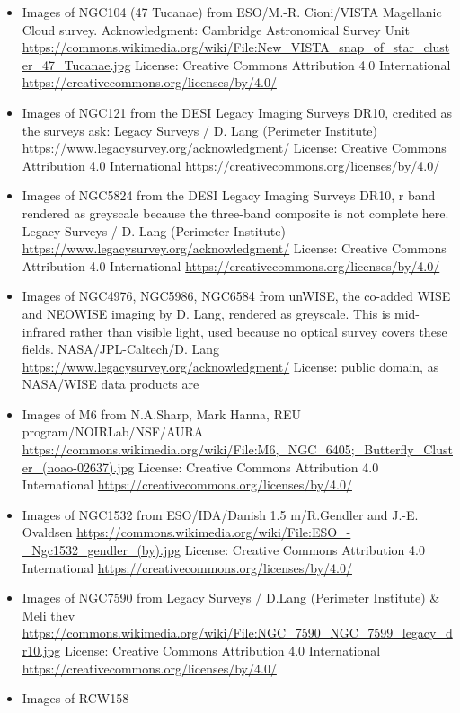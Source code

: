 \begin{itemize}
	 License: Creative Commons Attribution 4.0 International \url{https://creativecommons.org/licenses/by/4.0/}
\item Images of NGC104 (47 Tucanae)
	 from ESO/M.-R. Cioni/VISTA Magellanic Cloud survey. Acknowledgment: Cambridge Astronomical Survey Unit
	 \url{https://commons.wikimedia.org/wiki/File:New_VISTA_snap_of_star_cluster_47_Tucanae.jpg}
	 License: Creative Commons Attribution 4.0 International \url{https://creativecommons.org/licenses/by/4.0/}
\item Images of NGC121
	 from the DESI Legacy Imaging Surveys DR10, credited as the surveys ask: Legacy Surveys / D. Lang (Perimeter Institute)
	 \url{https://www.legacysurvey.org/acknowledgment/}
	 License: Creative Commons Attribution 4.0 International \url{https://creativecommons.org/licenses/by/4.0/}
\item Images of NGC5824
	 from the DESI Legacy Imaging Surveys DR10, r band rendered as greyscale because the three-band composite is not complete here. Legacy Surveys / D. Lang (Perimeter Institute)
	 \url{https://www.legacysurvey.org/acknowledgment/}
	 License: Creative Commons Attribution 4.0 International \url{https://creativecommons.org/licenses/by/4.0/}
\item Images of NGC4976, NGC5986, NGC6584
	 from unWISE, the co-added WISE and NEOWISE imaging by D. Lang, rendered as greyscale. This is mid-infrared rather than visible light, used because no optical survey covers these fields. NASA/JPL-Caltech/D. Lang
	 \url{https://www.legacysurvey.org/acknowledgment/}
	 License: public domain, as NASA/WISE data products are
\item Images of M6
	 from N.A.Sharp, Mark Hanna, REU program/NOIRLab/NSF/AURA
	 \url{https://commons.wikimedia.org/wiki/File:M6,_NGC_6405;_Butterfly_Cluster_(noao-02637).jpg}
	 License: Creative Commons Attribution 4.0 International \url{https://creativecommons.org/licenses/by/4.0/}
\item Images of NGC1532
	 from ESO/IDA/Danish 1.5 m/R.Gendler and J.-E. Ovaldsen
	 \url{https://commons.wikimedia.org/wiki/File:ESO_-_Ngc1532_gendler_(by).jpg}
	 License: Creative Commons Attribution 4.0 International \url{https://creativecommons.org/licenses/by/4.0/}
\item Images of NGC7590
	 from Legacy Surveys / D.Lang (Perimeter Institute) & Meli thev
	 \url{https://commons.wikimedia.org/wiki/File:NGC_7590_NGC_7599_legacy_dr10.jpg}
	 License: Creative Commons Attribution 4.0 International \url{https://creativecommons.org/licenses/by/4.0/}
\item Images of RCW158

\end{itemize}
